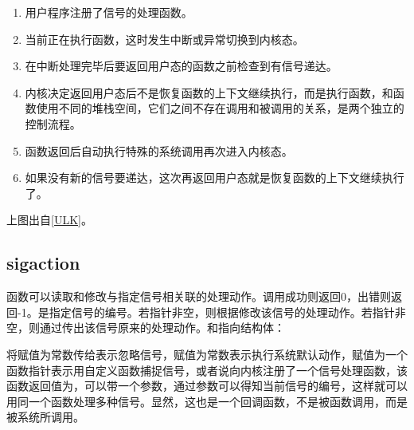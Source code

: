 \begin{enumerate}

\item 用户程序注册了信号的处理函数。

\item 当前正在执行函数，这时发生中断或异常切换到内核态。

\item 在中断处理完毕后要返回用户态的函数之前检查到有信号递达。

\item 内核决定返回用户态后不是恢复函数的上下文继续执行，而是执行函数，和函数使用不同的堆栈空间，它们之间不存在调用和被调用的关系，是两个独立的控制流程。

\item {}函数返回后自动执行特殊的系统调用再次进入内核态。

\item 如果没有新的信号要递达，这次再返回用户态就是恢复函数的上下文继续执行了。
\end{enumerate}



上图出自\hyperlink{db.bi01.bibli.ulk}{[ULK]}。


\subsection{sigaction}
%



函数可以读取和修改与指定信号相关联的处理动作。调用成功则返回0，出错则返回-1。是指定信号的编号。若指针非空，则根据修改该信号的处理动作。若指针非空，则通过传出该信号原来的处理动作。和指向结构体：




将赋值为常数传给表示忽略信号，赋值为常数表示执行系统默认动作，赋值为一个函数指针表示用自定义函数捕捉信号，或者说向内核注册了一个信号处理函数，该函数返回值为，可以带一个参数，通过参数可以得知当前信号的编号，这样就可以用同一个函数处理多种信号。显然，这也是一个回调函数，不是被函数调用，而是被系统所调用。



